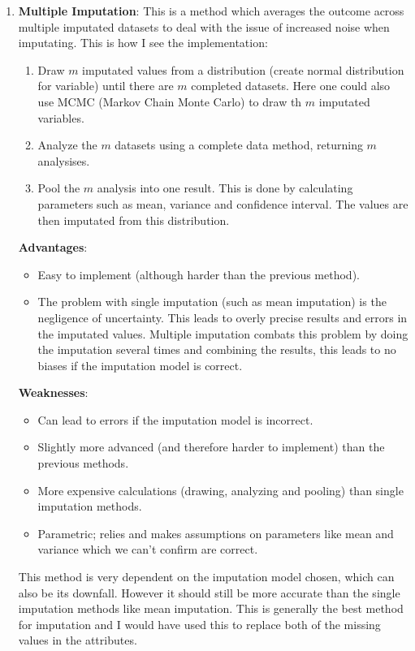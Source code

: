 \documentclass[11pt, english]{../Template/NTNUoving}
\begin{document}
\begin{oppgave}
\begin{enumerate}
        \item \textbf{Multiple Imputation}\cite{MI}: This is a method which averages the outcome across multiple imputated datasets to deal with the issue of increased noise when imputating.
        This is how I see the implementation:
        \begin{enumerate}[label=\arabic*]
            \item Draw $m$ imputated values from a distribution (create normal distribution for variable) until there are $m$ completed datasets. Here one could also use MCMC (Markov Chain Monte Carlo)\cite{MCMC} to draw th $m$ imputated variables.
            \item Analyze the $m$ datasets using a complete data method, returning $m$ analysises.
            \item Pool the $m$ analysis into one result. This is done by calculating parameters such as mean, variance and confidence interval. The values are then imputated from this distribution.
        \end{enumerate}
        \textbf{Advantages}:
        \begin{itemize}
            \item Easy to implement (although harder than the previous method).
            \item The problem with single imputation (such as mean imputation) is the negligence of uncertainty. This leads to overly precise results and errors in the imputated values.
            Multiple imputation combats this problem by doing the imputation several times and combining the results, this leads to no biases if the imputation model is correct.
        \end{itemize}
        \textbf{Weaknesses}:
        \begin{itemize}
            \item Can lead to errors if the imputation model is incorrect.
            \item Slightly more advanced (and therefore harder to implement) than the previous methods.
            \item More expensive calculations (drawing, analyzing and pooling) than single imputation methods.
            \item Parametric; relies and makes assumptions on parameters like mean and variance which we can't confirm are correct.
        \end{itemize}
        This method is very dependent on the imputation model chosen, which can also be its downfall. However it should still be more accurate than the
        single imputation methods like mean imputation. This is generally the best method for imputation and I would have used this to replace both of the missing values in the attributes.
    \end{enumerate}
\end{oppgave}

\printbibliography
\end{document}
